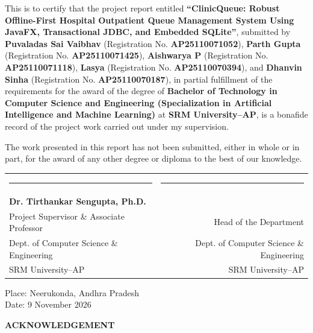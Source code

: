 \documentclass[12pt,a4paper,oneside]{report}
\begin{document}
\noindent
This is to certify that the project report entitled \textbf{“ClinicQueue: Robust Offline-First Hospital Outpatient Queue Management System Using JavaFX, Transactional JDBC, and Embedded SQLite”}, submitted by \textbf{Puvaladas Sai Vaibhav} (Registration No. \textbf{AP25110071052}), \textbf{Parth Gupta} (Registration No. \textbf{AP25110071425}), \textbf{Aishwarya P} (Registration No. \textbf{AP25110071118}), \textbf{Lasya} (Registration No. \textbf{AP25110070394}), and \textbf{Dhanvin Sinha} (Registration No. \textbf{AP25110070187}), in partial fulfillment of the requirements for the award of the degree of \textbf{Bachelor of Technology in Computer Science and Engineering (Specialization in Artificial Intelligence and Machine Learning)} at \textbf{SRM University--AP}, is a bonafide record of the project work carried out under my supervision.

\vspace{0.3cm}
\noindent
The work presented in this report has not been submitted, either in whole or in part, for the award of any other degree or diploma to the best of our knowledge.

\vspace{2.5cm}

\noindent
\begin{tabularx}{\textwidth}{X r}
\rule{6.0cm}{0.4pt} & \rule{6.0cm}{0.4pt} \\
\textbf{Dr. Tirthankar Sengupta, Ph.D.}  \\
Project Supervisor \& Associate Professor & Head of the Department \\
Dept. of Computer Science \& Engineering & Dept. of Computer Science \& Engineering \\
SRM University--AP & SRM University--AP \\
\end{tabularx}

\vspace{1.2cm}
\noindent
Place: Neerukonda, Andhra Pradesh\\
Date: 9 November 2026

\newpage
\begin{center}
    \vspace*{0.2cm}
    {\Huge \textbf{ACKNOWLEDGEMENT}}\\[0.6cm]
\end{center}
\end{document}

